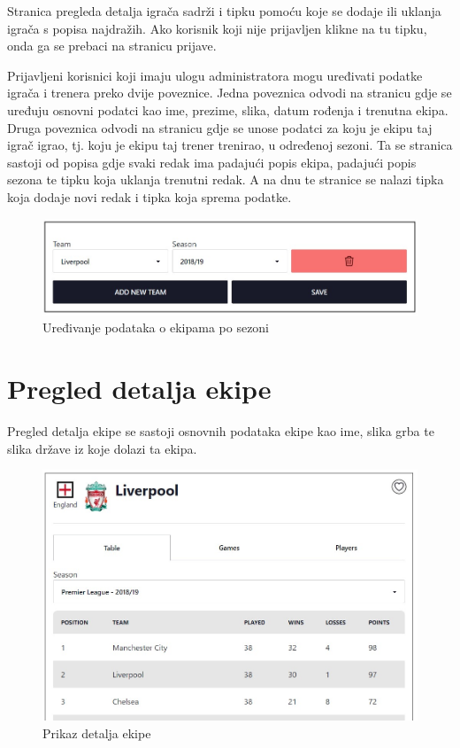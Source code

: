 \documentclass[times, utf8, zavrsni]{fer}
\begin{document}
Stranica pregleda detalja igrača sadrži i tipku pomoću koje se dodaje ili uklanja igrača s popisa najdražih. Ako korisnik koji nije prijavljen klikne na tu tipku, onda ga se prebaci na stranicu prijave.

Prijavljeni korisnici koji imaju ulogu administratora mogu uređivati podatke igrača i trenera preko dvije poveznice.
Jedna poveznica odvodi na stranicu gdje se uređuju osnovni podatci kao ime, prezime, slika, datum rođenja i trenutna ekipa.
Druga poveznica odvodi na stranicu gdje se unose podatci za koju je ekipu taj igrač igrao, tj. koju je ekipu taj trener trenirao, u određenoj sezoni.
Ta se stranica sastoji od popisa gdje svaki redak ima padajući popis ekipa, padajući popis sezona te tipku koja uklanja trenutni redak.
A na dnu te stranice se nalazi tipka koja dodaje novi redak i tipka koja sprema podatke.

\begin{figure}[htb]
\centering
\includegraphics[width=14cm]{images/per-season.jpg}
\caption{Uređivanje podataka o ekipama po sezoni}
\label{fig:per-season}
\end{figure}

\newpage
\section{Pregled detalja ekipe}

Pregled detalja ekipe se sastoji osnovnih podataka ekipe kao ime, slika grba te slika države iz koje dolazi ta ekipa.

\begin{figure}[htb]
\centering
\includegraphics[width=14cm]{images/team.jpg}
\caption{Prikaz detalja ekipe}
\label{fig:per-season}
\end{figure}
\end{document}
